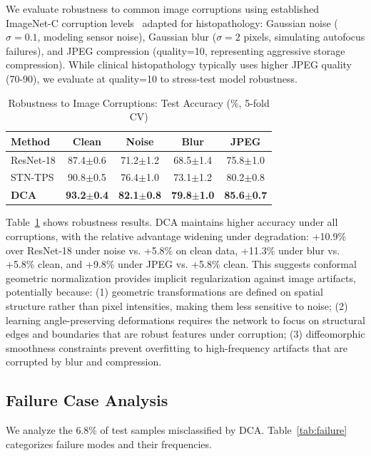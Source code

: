 \documentclass[final,3p,times,review,sort&compress]{elsarticle}
\begin{document}
We evaluate robustness to common image corruptions using established ImageNet-C corruption levels~\cite{hendrycks2019benchmarking} adapted for histopathology: Gaussian noise ($\sigma=0.1$, modeling sensor noise), Gaussian blur ($\sigma=2$ pixels, simulating autofocus failures), and JPEG compression (quality=10, representing aggressive storage compression). While clinical histopathology typically uses higher JPEG quality (70-90), we evaluate at quality=10 to stress-test model robustness.

\begin{table}[t]
\centering
\caption{Robustness to Image Corruptions: Test Accuracy (\%, 5-fold CV)}
\label{tab:robustness}
\begin{tabularx}{\textwidth}{Xcccc}
\hline
\textbf{Method} & \textbf{Clean} & \textbf{Noise} & \textbf{Blur} & \textbf{JPEG} \\
\hline
ResNet-18 & 87.4$\pm$0.6 & 71.2$\pm$1.2 & 68.5$\pm$1.4 & 75.8$\pm$1.0 \\
STN-TPS & 90.8$\pm$0.5 & 76.4$\pm$1.0 & 73.1$\pm$1.2 & 80.2$\pm$0.8 \\
\textbf{DCA} & \textbf{93.2$\pm$0.4} & \textbf{82.1$\pm$0.8} & \textbf{79.8$\pm$1.0} & \textbf{85.6$\pm$0.7} \\
\hline
\end{tabularx}
\end{table}

Table~\ref{tab:robustness} shows robustness results. DCA maintains higher accuracy under all corruptions, with the relative advantage widening under degradation: +10.9\% over ResNet-18 under noise vs. +5.8\% on clean data, +11.3\% under blur vs. +5.8\% clean, and +9.8\% under JPEG vs. +5.8\% clean. This suggests conformal geometric normalization provides implicit regularization against image artifacts, potentially because: (1) geometric transformations are defined on spatial structure rather than pixel intensities, making them less sensitive to noise; (2) learning angle-preserving deformations requires the network to focus on structural edges and boundaries that are robust features under corruption; (3) diffeomorphic smoothness constraints prevent overfitting to high-frequency artifacts that are corrupted by blur and compression.

\subsection{Failure Case Analysis}

We analyze the 6.8\% of test samples misclassified by DCA. Table~\ref{tab:failure} categorizes failure modes and their frequencies.
\end{document}
